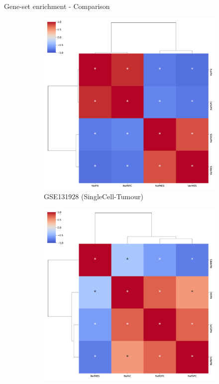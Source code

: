 \documentclass[aspectratio=169,9pt]{beamer}
\begin{document}
    \begin{frame}{Gene-set enrichment - Comparison}
        \begin{adjustwidth}{-5cm}{-5cm}
            \centering
            \begin{figure}\ContinuedFloat
                \centering
                \begin{subfigure}[c]{0.48\textwidth}
                    \centering
                    \includegraphics[width=\textwidth]{GSEA_GSM3828672_corrplot_2D}
                    \caption{GSE131928 (SingleCell-Tumour)}
                \end{subfigure}
                \begin{subfigure}[c]{0.48\textwidth}
                    \centering
                    \includegraphics[width=\textwidth]{GSEA_celllines_corrplot_Nef}

\end{subfigure}
\end{figure}
\end{adjustwidth}
\end{frame}
\end{document}
